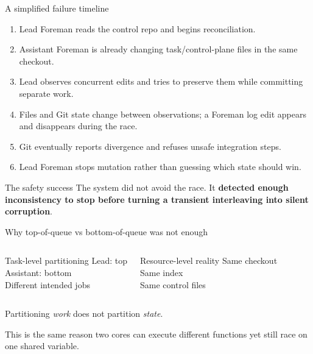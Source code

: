 \documentclass{beamer}
\begin{document}
\begin{frame}{A simplified failure timeline}
\small
\begin{enumerate}
  \item Lead Foreman reads the control repo and begins reconciliation.
  \item Assistant Foreman is already changing task/control-plane files in the same checkout.
  \item Lead observes concurrent edits and tries to preserve them while committing separate work.
  \item Files and Git state change between observations; a Foreman log edit appears and disappears during the race.
  \item Git eventually reports divergence and refuses unsafe integration steps.
  \item Lead Foreman stops mutation rather than guessing which state should win.
\end{enumerate}

\vspace{0.6em}
\begin{block}{The safety success}
The system did not avoid the race. It \textbf{detected enough inconsistency to stop before turning a transient interleaving into silent corruption}.
\end{block}
\end{frame}

\begin{frame}{Why top-of-queue vs bottom-of-queue was not enough}
\begin{columns}[T]
\begin{block}{Task-level partitioning}
Lead: top\\
Assistant: bottom\\
Different intended jobs
\end{block}

\begin{block}{Resource-level reality}
Same checkout\\
Same index\\
Same control files
\end{block}
\end{columns}

\vspace{1em}
\centering
\Large Partitioning \textit{work} does not partition \textit{state}.

\vspace{0.6em}
\normalsize
This is the same reason two cores can execute different functions yet still race on one shared variable.
\end{frame}
\end{document}
